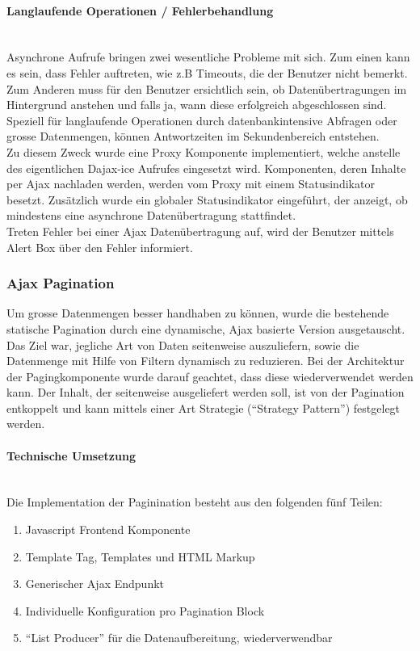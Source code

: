 \paragraph{Langlaufende Operationen / Fehlerbehandlung}\hspace{0pt}\\
Asynchrone Aufrufe bringen zwei wesentliche Probleme mit sich. Zum einen kann es
sein, dass Fehler auftreten, wie z.B Timeouts, die der Benutzer nicht bemerkt.
Zum Anderen muss für den Benutzer ersichtlich sein, ob Datenübertragungen im
Hintergrund anstehen und falls ja, wann diese erfolgreich abgeschlossen sind.
Speziell für langlaufende Operationen durch datenbankintensive Abfragen oder
grosse Datenmengen, können Antwortzeiten im Sekundenbereich entstehen. \\
Zu diesem Zweck wurde eine Proxy Komponente \cite{gamma1994design}
implementiert, welche anstelle des eigentlichen Dajax-ice Aufrufes eingesetzt
wird. Komponenten, deren Inhalte per Ajax nachladen werden, werden vom Proxy mit
einem Statusindikator besetzt. Zusätzlich wurde ein globaler Statusindikator
eingeführt, der anzeigt, ob mindestens eine asynchrone Datenübertragung
stattfindet.\\
Treten Fehler bei einer Ajax Datenübertragung auf, wird der Benutzer mittels
Alert Box über den Fehler informiert.

\subsubsection{Ajax Pagination} 
Um grosse Datenmengen besser handhaben zu können, wurde die bestehende statische
Pagination durch eine dynamische, Ajax basierte Version ausgetauscht. Das Ziel
war, jegliche Art von Daten seitenweise auszuliefern, sowie die Datenmenge mit
Hilfe von Filtern dynamisch zu reduzieren. Bei der Architektur der
Pagingkomponente wurde darauf geachtet, dass diese wiederverwendet werden kann.
Der Inhalt, der seitenweise ausgeliefert werden soll, ist von der Pagination
entkoppelt und kann mittels einer Art Strategie (\enquote{Strategy Pattern}\cite{gamma1994design}) festgelegt werden.

\paragraph{Technische Umsetzung} \hspace{0pt} \\
Die Implementation der Paginination besteht aus den folgenden fünf Teilen:
\begin{enumerate}
	\item Javascript Frontend Komponente
	\item Template Tag, Templates und HTML Markup
	\item Generischer Ajax Endpunkt
	\item Individuelle Konfiguration pro Pagination Block
	\item \enquote{List Producer} für die Datenaufbereitung, wiederverwendbar
\end{enumerate}

